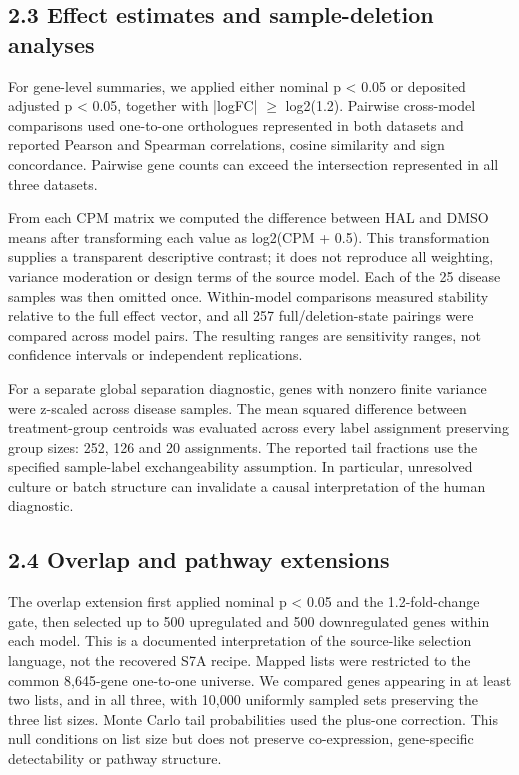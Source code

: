\documentclass[a4paper,10pt]{article}
\begin{document}
\subsection*{2.3 Effect estimates and sample-deletion analyses}
For gene-level summaries, we applied either nominal p < 0.05 or deposited adjusted p < 0.05, together with |logFC| \ensuremath{\geq} log2(1.2). Pairwise cross-model comparisons used one-to-one orthologues represented in both datasets and reported Pearson and Spearman correlations, cosine similarity and sign concordance. Pairwise gene counts can exceed the intersection represented in all three datasets.

From each CPM matrix we computed the difference between HAL and DMSO means after transforming each value as log2(CPM + 0.5). This transformation supplies a transparent descriptive contrast; it does not reproduce all weighting, variance moderation or design terms of the source model. Each of the 25 disease samples was then omitted once. Within-model comparisons measured stability relative to the full effect vector, and all 257 full/deletion-state pairings were compared across model pairs. The resulting ranges are sensitivity ranges, not confidence intervals or independent replications.

For a separate global separation diagnostic, genes with nonzero finite variance were z-scaled across disease samples. The mean squared difference between treatment-group centroids was evaluated across every label assignment preserving group sizes: 252, 126 and 20 assignments. The reported tail fractions use the specified sample-label exchangeability assumption. In particular, unresolved culture or batch structure can invalidate a causal interpretation of the human diagnostic.

\subsection*{2.4 Overlap and pathway extensions}
The overlap extension first applied nominal p < 0.05 and the 1.2-fold-change gate, then selected up to 500 upregulated and 500 downregulated genes within each model. This is a documented interpretation of the source-like selection language, not the recovered S7A recipe. Mapped lists were restricted to the common 8,645-gene one-to-one universe. We compared genes appearing in at least two lists, and in all three, with 10,000 uniformly sampled sets preserving the three list sizes. Monte Carlo tail probabilities used the plus-one correction. This null conditions on list size but does not preserve co-expression, gene-specific detectability or pathway structure.
\end{document}
